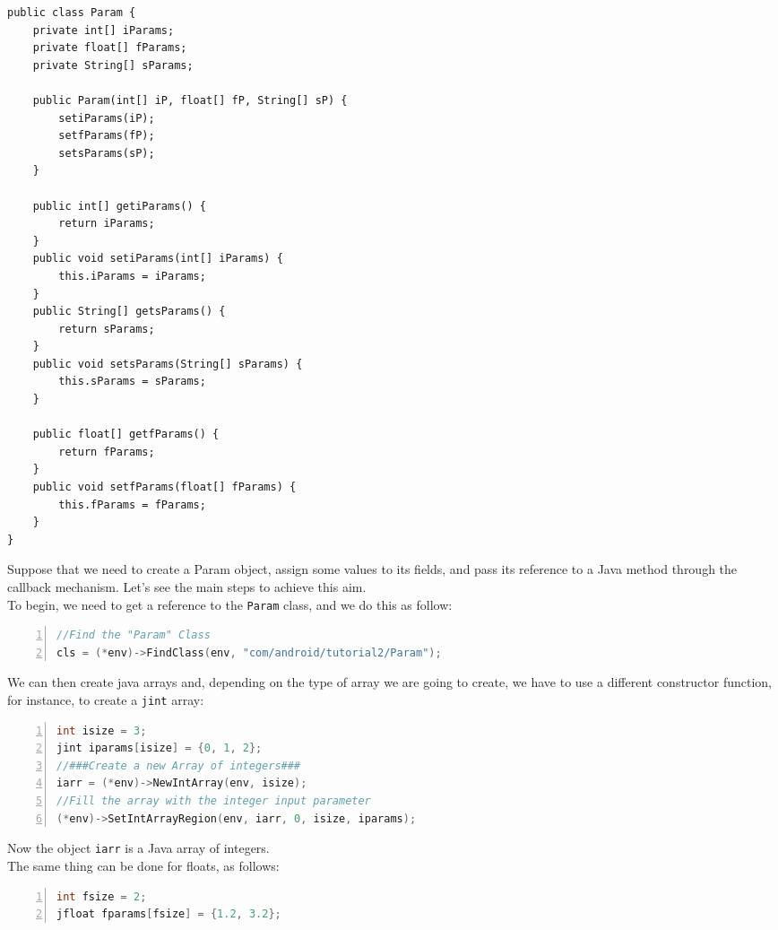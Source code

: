 \documentclass[a4paper,10pt]{article}
\newcommand{\keyword}[1]{\texttt{#1}}
\begin{document}
\begin{multicols}{2}
\begin{lstlisting}
public class Param {
	private int[] iParams;
	private float[] fParams;
	private String[] sParams;

	public Param(int[] iP, float[] fP, String[] sP) {
		setiParams(iP);
		setfParams(fP);
		setsParams(sP);
	}

	public int[] getiParams() {
		return iParams;
	}
	public void setiParams(int[] iParams) {
		this.iParams = iParams;
	}
	public String[] getsParams() {
		return sParams;
	}
	public void setsParams(String[] sParams) {
		this.sParams = sParams;
	}

	public float[] getfParams() {
		return fParams;
	}
	public void setfParams(float[] fParams) {
		this.fParams = fParams;
	}
}
\end{lstlisting}
Suppose that we need to create a Param object, assign some values to its fields, and pass its reference to a Java method through the callback mechanism. Let's see the main steps to achieve this aim.\\
To begin, we need to get a reference to the \keyword{Param} class, and we do this as follow:
\begin{lstlisting}[language=C,
				   columns=fullflexible,
				   showstringspaces=false,
				   xleftmargin=15pt,
				   frame = l,
				   numbers=left,
				   commentstyle=\color{gray}\upshape]
//Find the "Param" Class
cls = (*env)->FindClass(env, "com/android/tutorial2/Param");
\end{lstlisting}
We can then create java arrays and, depending on the type of array we are going to create, we have to use a different constructor function, for instance, to create a \keyword{jint} array:
\begin{lstlisting}[language=C,
				   columns=fullflexible,
				   showstringspaces=false,
				   xleftmargin=15pt,
				   frame = l,
				   numbers=left,
				   commentstyle=\color{gray}\upshape]
int isize = 3;
jint iparams[isize] = {0, 1, 2};
//###Create a new Array of integers###
iarr = (*env)->NewIntArray(env, isize);
//Fill the array with the integer input parameter
(*env)->SetIntArrayRegion(env, iarr, 0, isize, iparams);
\end{lstlisting}
Now the object \keyword{iarr} is a Java array of integers.\\
The same thing can be done for floats, as follows:
\begin{lstlisting}[language=C,
				   columns=fullflexible,
				   showstringspaces=false,
				   xleftmargin=15pt,
				   frame = l,
				   numbers=left,
				   commentstyle=\color{gray}\upshape]
int fsize = 2;
jfloat fparams[fsize] = {1.2, 3.2};

\end{lstlisting}
\end{multicols}
\end{document}
